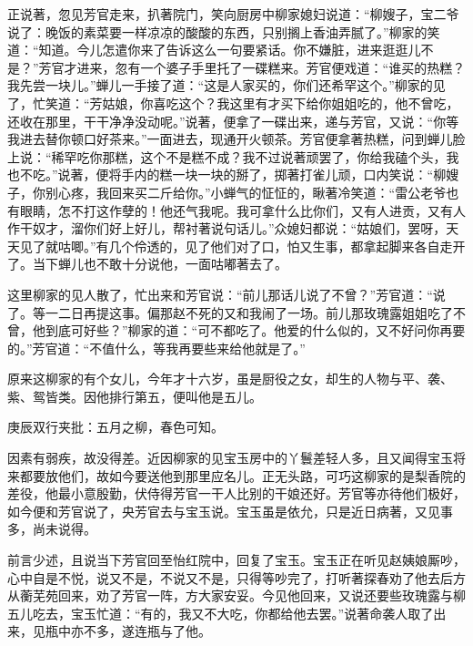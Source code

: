 \begin{parag}
    正说著，忽见芳官走来，扒著院门，笑向厨房中柳家媳妇说道：“柳嫂子，宝二爷说了：晚饭的素菜要一样凉凉的酸酸的东西，只别搁上香油弄腻了。”柳家的笑道：“知道。今儿怎遣你来了告诉这么一句要紧话。你不嫌脏，进来逛逛儿不是？”芳官才进来，忽有一个婆子手里托了一碟糕来。芳官便戏道：“谁买的热糕？我先尝一块儿。”蝉儿一手接了道：“这是人家买的，你们还希罕这个。”柳家的见了，忙笑道：“芳姑娘，你喜吃这个？我这里有才买下给你姐姐吃的，他不曾吃，还收在那里，干干净净没动呢。”说著，便拿了一碟出来，递与芳官，又说：“你等我进去替你顿口好茶来。”一面进去，现通开火顿茶。芳官便拿著热糕，问到蝉儿脸上说：“稀罕吃你那糕，这个不是糕不成？我不过说著顽罢了，你给我磕个头，我也不吃。”说著，便将手内的糕一块一块的掰了，掷著打雀儿顽，口内笑说：“柳嫂子，你别心疼，我回来买二斤给你。”小蝉气的怔怔的，瞅著冷笑道：“雷公老爷也有眼睛，怎不打这作孽的！他还气我呢。我可拿什么比你们，又有人进贡，又有人作干奴才，溜你们好上好儿，帮衬著说句话儿。”众媳妇都说：“姑娘们，罢呀，天天见了就咕唧。”有几个伶透的，见了他们对了口，怕又生事，都拿起脚来各自走开了。当下蝉儿也不敢十分说他，一面咕嘟著去了。
\end{parag}


\begin{parag}
    这里柳家的见人散了，忙出来和芳官说：“前儿那话儿说了不曾？”芳官道：“说了。等一二日再提这事。偏那赵不死的又和我闹了一场。前儿那玫瑰露姐姐吃了不曾，他到底可好些？”柳家的道：“可不都吃了。他爱的什么似的，又不好问你再要的。”芳官道：“不值什么，等我再要些来给他就是了。”
\end{parag}


\begin{parag}
    原来这柳家的有个女儿，今年才十六岁，虽是厨役之女，却生的人物与平、袭、紫、鸳皆类。因他排行第五，便叫他是五儿。\begin{note}庚辰双行夹批：五月之柳，春色可知。\end{note}因素有弱疾，故没得差。近因柳家的见宝玉房中的丫鬟差轻人多，且又闻得宝玉将来都要放他们，故如今要送他到那里应名儿。正无头路，可巧这柳家的是梨香院的差役，他最小意殷勤，伏侍得芳官一干人比别的干娘还好。芳官等亦待他们极好，如今便和芳官说了，央芳官去与宝玉说。宝玉虽是依允，只是近日病著，又见事多，尚未说得。
\end{parag}


\begin{parag}
    前言少述，且说当下芳官回至怡红院中，回复了宝玉。宝玉正在听见赵姨娘厮吵，心中自是不悦，说又不是，不说又不是，只得等吵完了，打听著探春劝了他去后方从蘅芜苑回来，劝了芳官一阵，方大家安妥。今见他回来，又说还要些玫瑰露与柳五儿吃去，宝玉忙道：“有的，我又不大吃，你都给他去罢。”说著命袭人取了出来，见瓶中亦不多，遂连瓶与了他。
\end{parag}


